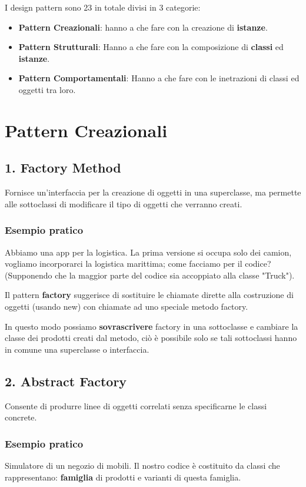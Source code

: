 \documentclass{report}
\begin{document}
\medskip
\noindent
I design pattern sono 23 in totale divisi in 3 categorie:
\begin{itemize}
    \item \textbf{Pattern Creazionali}: hanno a che fare con la creazione di \textbf{istanze}.
    \item \textbf{Pattern Strutturali}: Hanno a che fare con la composizione di \textbf{classi} ed \textbf{istanze}.
    \item \textbf{Pattern Comportamentali}: Hanno a che fare con le inetrazioni di classi ed oggetti tra loro.
\end{itemize}

\section{Pattern Creazionali}
\subsection*{1. Factory Method}
Fornisce un'interfaccia per la creazione di oggetti in una superclasse, ma permette alle sottoclassi di modificare il tipo di oggetti che verranno creati.

\subsubsection*{Esempio pratico}
Abbiamo una app per la logistica. La prima versione si occupa solo dei camion, vogliamo incorporarci la logistica marittima; come facciamo per il codice? (Supponendo che la maggior parte del codice sia accoppiato alla classe "Truck").

\medskip
\noindent
Il pattern \textbf{factory} suggerisce di sostituire le chiamate dirette alla costruzione di oggetti (usando new) con chiamate ad uno speciale metodo factory.

\noindent
In questo modo possiamo \textbf{sovrascrivere} factory in una sottoclasse e cambiare la classe dei prodotti creati dal metodo, ciò è possibile solo se tali sottoclassi hanno in comune una superclasse o interfaccia.

\subsection*{2. Abstract Factory}
Consente di produrre linee di oggetti correlati senza specificarne le classi concrete.

\subsubsection*{Esempio pratico}
Simulatore di un negozio di mobili. Il nostro codice è costituito da classi che rappresentano: \textbf{famiglia} di prodotti e varianti di questa famiglia.
\end{document}
